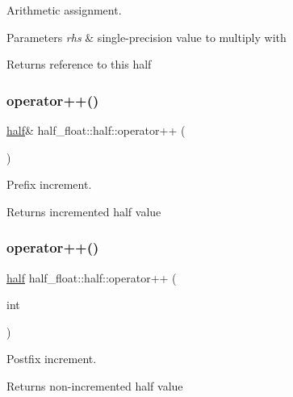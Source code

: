 Arithmetic assignment. 
\begin{DoxyParams}{Parameters}
{\em rhs} & single-\/precision value to multiply with \\
\hline
\end{DoxyParams}
\begin{DoxyReturn}{Returns}
reference to this half 
\end{DoxyReturn}
\mbox{\label{classhalf__float_1_1half_ad902e63995af7942b1e498eb381dcdd9}} 
\subsubsection{\texorpdfstring{operator++()}{operator++()}\hspace{0.1cm}{\footnotesize\ttfamily [1/2]}}
{\footnotesize\ttfamily \hyperlink{classhalf__float_1_1half}{half}\& half\+\_\+float\+::half\+::operator++ (\begin{DoxyParamCaption}{ }\end{DoxyParamCaption})\hspace{0.3cm}{\ttfamily [inline]}}

Prefix increment. \begin{DoxyReturn}{Returns}
incremented half value 
\end{DoxyReturn}
\mbox{\label{classhalf__float_1_1half_a1a88e6a51b683bb7f3c57997d73561ed}} 
\subsubsection{\texorpdfstring{operator++()}{operator++()}\hspace{0.1cm}{\footnotesize\ttfamily [2/2]}}
{\footnotesize\ttfamily \hyperlink{classhalf__float_1_1half}{half} half\+\_\+float\+::half\+::operator++ (\begin{DoxyParamCaption}\item[{int}]{ }\end{DoxyParamCaption})\hspace{0.3cm}{\ttfamily [inline]}}

Postfix increment. \begin{DoxyReturn}{Returns}
non-\/incremented half value 
\end{DoxyReturn}
\mbox{\label{classhalf__float_1_1half_aa562db3abdbf9c0bca4150f7cfa6bd1b}} 
